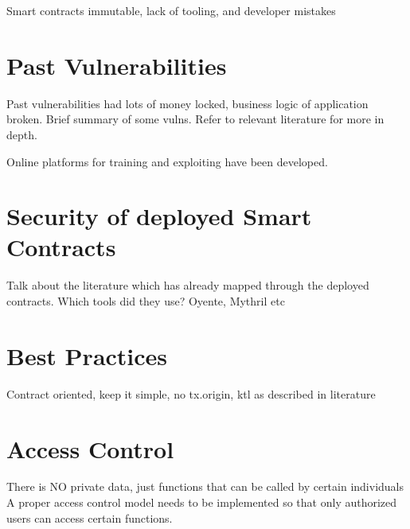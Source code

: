 Smart contracts immutable, lack of tooling, and developer mistakes

\section{Past Vulnerabilities}
Past vulnerabilities had lots of money locked, business logic of application broken. Brief summary of some vulns. Refer to relevant literature for more in depth.

Online platforms for training and exploiting have been developed.

\section{Security of deployed Smart Contracts}
Talk about the literature which has already mapped through the deployed contracts. 
Which tools did they use? Oyente, Mythril etc

\section{Best Practices}
Contract oriented, keep it simple, no tx.origin, ktl as described in literature


\section{Access Control}
There is NO private data, just functions that can be called by certain individuals
A proper access control model needs to be implemented so that only authorized users can access certain functions. 
